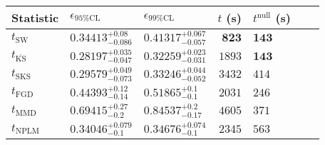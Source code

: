 \begin{tabular}{l|llr|llr}
Statistic & $\epsilon_{95\%\mathrm{CL}}$ & $\epsilon_{99\%\mathrm{CL}}$ & $t$ (s) & $t^{\mathrm{null}}$ (s) \\
	\midrule
	$t_{\mathrm{SW}}$ & $0.34413_{-0.086}^{+0.08}$ & $0.41317_{-0.057}^{+0.067}$ & ${\mathbf{823}}$ & ${\mathbf{143}}$ \\
	$t_{\overline{\mathrm{KS}}}$ & ${\mathbf{0.28197_{-0.047}^{+0.035}}}$ & ${\mathbf{0.32259_{-0.031}^{+0.023}}}$ & $1893$ & ${\mathbf{143}}$ \\
	$t_{\mathrm{SKS}}$ & $0.29579_{-0.073}^{+0.049}$ & $0.33246_{-0.052}^{+0.044}$ & $3432$ & $414$ \\
	$t_{\mathrm{FGD}}$ & $0.44393_{-0.14}^{+0.12}$ & $0.51865_{-0.1}^{+0.1}$ & $2031$ & $246$ \\
	$t_{\mathrm{MMD}}$ & $0.69415_{-0.2}^{+0.27}$ & $0.84537_{-0.17}^{+0.2}$ & $4605$ & $371$ \\
\rowcolor{red!35}	$t_{\mathrm{NPLM}}$ & $0.34046_{-0.1}^{+0.079}$ & $0.34676_{-0.1}^{+0.074}$ & $2345$ & $563$ \\
	\bottomrule
\end{tabular}
